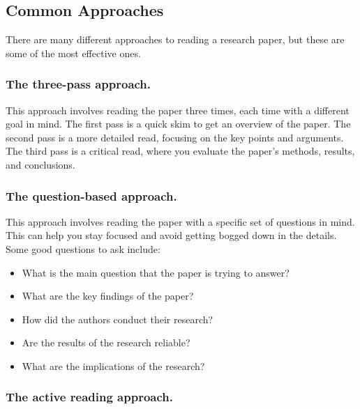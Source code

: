 \documentclass[
  b5paper]{book}
\begin{document}
\hypertarget{common-approaches}{%
\subsection*{Common Approaches}\label{common-approaches}}

There are many different approaches to reading a research paper, but these are some of the most effective ones.

\hypertarget{the-three-pass-approach.}{%
\subsubsection*{The three-pass approach.}\label{the-three-pass-approach.}}

This approach involves reading the paper three times, each time with a different goal in mind. The first pass is a quick skim to get an overview of the paper. The second pass is a more detailed read, focusing on the key points and arguments. The third pass is a critical read, where you evaluate the paper's methods, results, and conclusions.

\hypertarget{the-question-based-approach.}{%
\subsubsection*{The question-based approach.}\label{the-question-based-approach.}}

This approach involves reading the paper with a specific set of questions in mind. This can help you stay focused and avoid getting bogged down in the details. Some good questions to ask include:

\begin{itemize}
\item
  What is the main question that the paper is trying to answer?
\item
  What are the key findings of the paper?
\item
  How did the authors conduct their research?
\item
  Are the results of the research reliable?
\item
  What are the implications of the research?
\end{itemize}

\hypertarget{the-active-reading-approach.}{%
\subsubsection*{The active reading approach.}\label{the-active-reading-approach.}}
\end{document}
